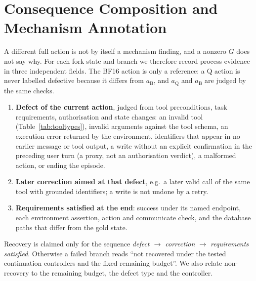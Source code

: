 \section{Consequence Composition and Mechanism Annotation}
\label{sec:annotation}

A different full action is not by itself a mechanism finding, and a nonzero $G$ does not say why. For each fork state and branch we therefore record process evidence in three independent fields. The BF16 action is only a reference: a Q action is never labelled defective because it differs from $a_{\mathrm{B}}$, and $a_{\mathrm{Q}}$ and $a_{\mathrm{B}}$ are judged by the same checks.
\begin{enumerate}[leftmargin=*,itemsep=1pt,topsep=2pt]
\item \textbf{Defect of the current action}, judged from tool preconditions, task requirements, authorisation and state changes: an invalid tool (Table~\ref{tab:tooltypes}), invalid arguments against the tool schema, an execution error returned by the environment, identifiers that appear in no earlier message or tool output, a write without an explicit confirmation in the preceding user turn (a proxy, not an authorisation verdict), a malformed action, or ending the episode.
\item \textbf{Later correction aimed at that defect}, e.g.\ a later valid call of the same tool with grounded identifiers; a write is not undone by a retry.
\item \textbf{Requirements satisfied at the end}: success under its named endpoint, each environment assertion, action and communicate check, and the database paths that differ from the gold state.
\end{enumerate}
Recovery is claimed only for the sequence \emph{defect $\rightarrow$ correction $\rightarrow$ requirements satisfied}. Otherwise a failed branch reads ``not recovered under the tested continuation controllers and the fixed remaining budget''. We also relate non-recovery to the remaining budget, the defect type and the controller.

